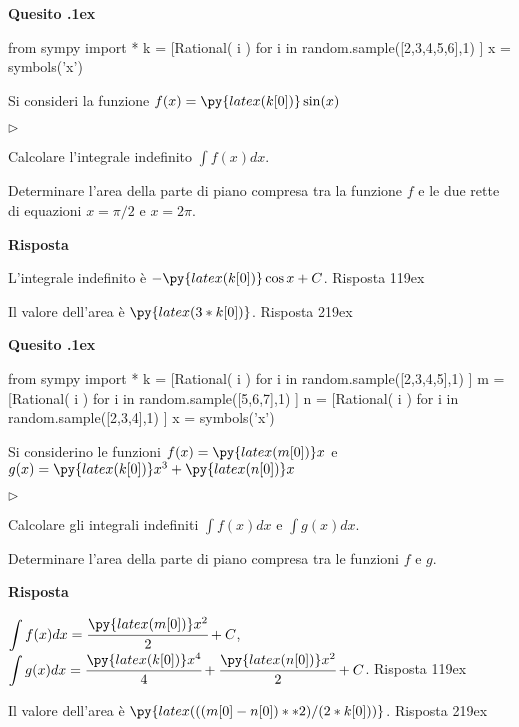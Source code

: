 \documentclass[11pt,twoside,a4paper]{article}
\newcommand{\mylabel}[1]{#1\hfill}
\renewenvironment{itemize}
  {\begin{list}{$\triangleright$}{%
   \setlength{\parskip}{0mm}
   \setlength{\topsep}{.4\baselineskip}
   \setlength{\rightmargin}{0mm}
   \setlength{\listparindent}{0mm}
   \setlength{\itemindent}{0mm}
   \setlength{\labelwidth}{2ex}
   \setlength{\itemsep}{.4\baselineskip}
   \setlength{\parsep}{0mm}
   \setlength{\partopsep}{0mm}
   \setlength{\labelsep}{1ex}
   \setlength{\leftmargin}{\labelwidth+\labelsep}
   \let\makelabel\mylabel}}{%
   \end{list}\vspace*{-1.3mm}}
\newcounter{quesito}
\newenvironment{question}{\bigskip\addtocounter{quesito}{1}\bigskip\bigskip\par\textbf{Quesito \thequesito.\kern1ex}}{\vspace{\parskip}}
\newenvironment{answer}{\par\textbf{Risposta\quad}}{\vspace{\parskip}}
\begin{document}
\begin{question}
\begin{pycode}
from sympy import *
k = [Rational( i ) for i in random.sample([2,3,4,5,6],1) ]
x = symbols('x')
\end{pycode}
Si consideri la funzione $f(x) = \py{latex(k[0])}\sin(x)$
\begin{itemize}
\item[1.] Calcolare l'integrale indefinito $\displaystyle \int f(x) dx$.
\item[2.] Determinare l'area della parte di piano compresa tra la funzione $f$ e le due rette di equazioni $x = \pi/2$ e $x = 2 \pi$.
\end{itemize}
\begin{answer}

{\color{blue} L'integrale indefinito è $-\py{latex(k[0])} \cos x + C$. 
\hfill Risposta 1\kern19ex}

\smallskip
{\color{blue} Il valore dell'area è $\py{latex(3*k[0])}$.
\hfill Risposta 2\kern19ex}

\end{answer}
\end{question}
\begin{question}
\begin{pycode}
from sympy import *
k = [Rational( i ) for i in random.sample([2,3,4,5],1) ]
m = [Rational( i ) for i in random.sample([5,6,7],1) ]
n = [Rational( i ) for i in random.sample([2,3,4],1) ]
x = symbols('x')
\end{pycode}
Si considerino le funzioni $f(x) = \py{latex(m[0])} x$ e $g(x) = \py{latex(k[0])} x^3 + \py{latex(n[0])} x$
\begin{itemize}
\item[1.] Calcolare gli integrali indefiniti $\displaystyle \int f(x) dx$ e $\displaystyle \int g(x) dx$.
\item[2.] Determinare l'area della parte di piano compresa tra le funzioni $f$ e $g$.
\end{itemize}
\begin{answer}

{\color{blue} $\displaystyle \int f(x) dx = \cfrac{\py{latex(m[0])} x^2}{2} + C$, $\displaystyle \int g(x) dx = \cfrac{\py{latex(k[0])}x^4}{4} +\cfrac{\py{latex(n[0])} x^2}{2} + C$. 
\hfill Risposta 1\kern19ex}

\smallskip
{\color{blue} Il valore dell'area è $\py{latex(((m[0]-n[0])**2)/(2*k[0]))}$.
\hfill Risposta 2\kern19ex}

\end{answer}
\end{question}
\end{document}
